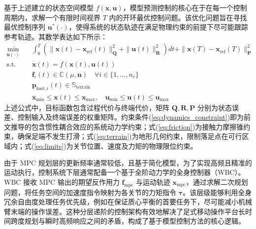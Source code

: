 基于上述建立的状态空间模型 $f(\mathbf{x}, \mathbf{u})$，模型预测控制的核心在于在每一个控制周期内，求解一个有限时间视界 $T$ 内的开环最优控制问题。该优化问题旨在寻找最优控制序列 $\mathbf{u}^*(\cdot)$，使得系统的状态轨迹在满足物理约束的前提下尽可能跟踪参考轨迹。其数学表达如下所示：
\begin{subequations}
    \begin{align}
        \min_{\mathbf{u}(\cdot)} \quad & \int_{0}^{T} \left( \|\mathbf{x}(t) - \mathbf{x}_{\text{ref}}(t)\|_{\mathbf{Q}}^2 + \|\mathbf{u}(t)\|_{\mathbf{R}}^2 \right) dt + \|\mathbf{x}(T) - \mathbf{x}_{\text{ref}}(T)\|_{\mathbf{P}}^2 \\
        \text{s.t.} \quad              & \dot{\mathbf{x}}(t) = f(\mathbf{x}(t), \mathbf{u}(t)) \label{eq:dynamics_constraint}                                                                                                            \\
                                       & \mathbf{f}_i(t) \in \mathbb{C}(\mu, \mathbf{n}) \quad \forall i \in \{1, \dots, n_c\} \label{eq:friction}                                                                                       \\
                                       & \mathbf{p}_{\text{foot}, i}(t) \in \mathbb{S}_{\text{terrain}} \label{eq:terrain}                                                                                                               \\
                                       & \mathbf{x}_{\text{min}} \leq \mathbf{x}(t) \leq \mathbf{x}_{\text{max}}, \quad \mathbf{u}_{\text{min}} \leq \mathbf{u}(t) \leq \mathbf{u}_{\text{max}} \label{eq:limits}
    \end{align}
\end{subequations}
上述公式中，目标函数包含过程代价与终端代价，矩阵 $\mathbf{Q}, \mathbf{R}, \mathbf{P}$ 分别为状态误差、控制输入及终端误差的权重矩阵。约束条件(\ref{eq:dynamics_constraint})即为前文推导的包含惯性耦合效应的系统动力学约束；式(\ref{eq:friction})为接触力摩擦锥约束，确保足端不发生打滑；式(\ref{eq:terrain})为地形几何约束，限制落足点在可行区域内；式(\ref{eq:limits})为关节位置、速度及力矩的物理限位约束。

由于 MPC 规划层的更新频率通常较低，且基于简化模型，为了实现高频且精准的运动执行，控制系统下层通常配备一个基于全阶动力学的全身控制器（WBC）。WBC 接收 MPC 输出的期望反作用力 $\mathbf{f}_{\text{mpc}}$ 与运动轨迹 $\mathbf{x}_{\text{mpc}}$，通过求解二次规划问题，将任务空间的加速度指令映射为各关节的力矩指令 $\boldsymbol{\tau}$。该层级能够利用全身冗余自由度处理任务优先级，例如在保证质心平衡的首要任务下，尽可能减小机械臂末端的操作误差。这种分层递阶的控制架构有效地解决了足式移动操作平台长时间跨度规划与瞬时高频响应之间的矛盾，构成了基于模型控制方法的核心逻辑\cite{bledt2018policy, bellicoso2017dynamic}。

